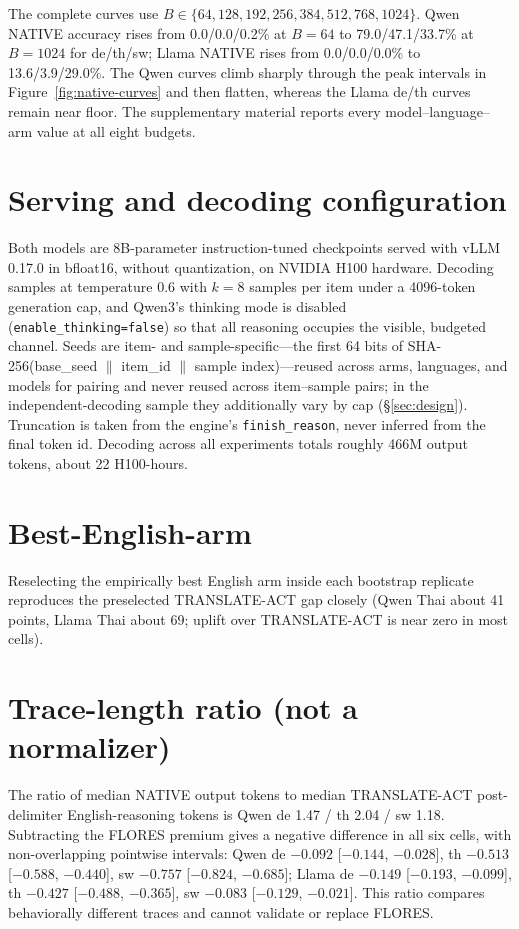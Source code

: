 \documentclass[11pt]{article}
\begin{document}
The complete curves use \(B\in\{64,128,192,256,384,512,768,1024\}\). Qwen NATIVE accuracy rises from 0.0/0.0/0.2\% at \(B=64\) to 79.0/47.1/33.7\% at \(B=1024\) for de/th/sw; Llama NATIVE rises from 0.0/0.0/0.0\% to 13.6/3.9/29.0\%. The Qwen curves climb sharply through the peak intervals in Figure~\ref{fig:native-curves} and then flatten, whereas the Llama de/th curves remain near floor. The supplementary material reports every model--language--arm value at all eight budgets.

\section{Serving and decoding configuration}
\label{app:compute}

Both models are 8B-parameter instruction-tuned checkpoints served with vLLM
0.17.0 in bfloat16, without quantization, on NVIDIA H100 hardware. Decoding
samples at temperature 0.6 with \(k=8\) samples per item under a 4096-token
generation cap, and Qwen3's thinking mode is disabled
(\texttt{enable\_thinking=false}) so that all reasoning occupies the visible,
budgeted channel. Seeds are item- and sample-specific---the first 64 bits of
SHA-256(base\_seed \(\|\) item\_id \(\|\) sample index)---reused across arms,
languages, and models for pairing and never reused across item--sample pairs;
in the independent-decoding sample they additionally vary by cap
(\S\ref{sec:design}). Truncation is taken from the engine's
\texttt{finish\_reason}, never inferred from the final token id. Decoding
across all experiments totals roughly 466M output tokens, about 22
H100-hours.

\section{Best-English-arm}
\label{app:bestarm}

Reselecting the empirically best English arm inside each bootstrap replicate reproduces the preselected TRANSLATE-ACT gap closely (Qwen Thai about 41 points, Llama Thai about 69; uplift over TRANSLATE-ACT is near zero in most cells).

\section{Trace-length ratio (not a normalizer)}
\label{app:ratio}

The ratio of median NATIVE output tokens to median TRANSLATE-ACT post-delimiter English-reasoning tokens is Qwen de 1.47 / th 2.04 / sw 1.18. Subtracting the FLORES premium gives a negative difference in all six cells, with non-overlapping pointwise intervals: Qwen de \(-0.092\) [\(-0.144\), \(-0.028\)], th \(-0.513\) [\(-0.588\), \(-0.440\)], sw \(-0.757\) [\(-0.824\), \(-0.685\)]; Llama de \(-0.149\) [\(-0.193\), \(-0.099\)], th \(-0.427\) [\(-0.488\), \(-0.365\)], sw \(-0.083\) [\(-0.129\), \(-0.021\)]. This ratio compares behaviorally different traces and cannot validate or replace FLORES.
\end{document}
